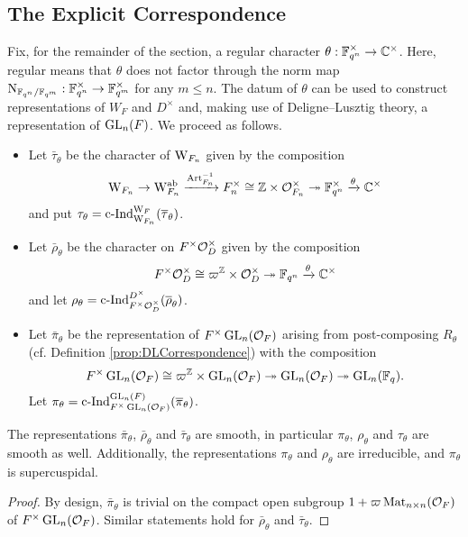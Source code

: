 \documentclass[../main.tex]{subfiles}
\begin{document}
\subsection{The Explicit Correspondence} %
\label{sub:The Explicit Correspondence}
Fix, for the remainder of the section, a regular character $\theta: \mathbb{F}_{q^n}^\times
\to \mathbb{C}^\times$. Here, regular means that $\theta$ does not factor through
the norm map $\mathrm{N}_{\mathbb{F}_{q^n}/\mathbb{F}_{q^m}}: \mathbb{F}_{q^n}^\times \to
\mathbb{F}_{q^m}^\times$ for any $m \leq n$. 
The datum of $\theta$ can be used to construct representations 
of $W_F$ and $D^\times$ and, making use of Deligne--Lusztig
theory, a representation of $\operatorname{GL}_n(F)$. We proceed as follows.
\begin{itemize}
  \item Let $\bar \tau_\theta$ be the character of $\mathrm W_{F_n}$ given by 
    the composition
    \begin{equation*}
      \mathrm W_{F_n} \to \mathrm W_{F_n}^{\mathrm{ab}} \xrightarrow{\mathrm{Art}_{F_n}^{-1}} F_n^\times \cong
      \mathbb{Z} \times \mathcal{O}_{F_n}^\times \twoheadrightarrow \mathbb{F}_{q^n}^\times \xrightarrow{\theta} \mathbb{C}^\times
    \end{equation*}
  and put $\tau_\theta = \mathrm{c\text{-}Ind}_{\mathrm W_{F_n}}^{\mathrm W_F}(\overline \tau_\theta)$.
  \item Let $\bar \rho_\theta$ be the character on 
    $F^\times \mathcal{O}_D^\times$ given by the composition
    \begin{equation*}
      F^\times\mathcal{O}_D^\times \cong \varpi^{\mathbb{Z}} \times \mathcal{O}_D^\times \twoheadrightarrow 
      \mathbb{F}_{q^n} \xrightarrow{\theta} \mathbb{C}^\times
    \end{equation*}
    and let $\rho_\theta = \mathrm{c\text{-}Ind}_{F^\times \mathcal{O}_D^\times}^{D^\times}(\overline \rho_\theta)$.
  \item Let $\bar \pi_\theta$ be the representation of $F^\times \operatorname{GL}_n(\mathcal{O}_F)$
    arising from post-composing $R_\theta$ (cf. Definition
    \ref{prop:DLCorrespondence}) with the composition
    \begin{equation*}
      F^\times \operatorname{GL}_n(\mathcal{O}_F) \cong \varpi^{\mathbb{Z}} \times \operatorname{GL}_n(\mathcal{O}_F)
      \twoheadrightarrow \operatorname{GL}_n(\mathcal{O}_F) \twoheadrightarrow \operatorname{GL}_n(\mathbb{F}_q).
    \end{equation*}
    Let $\pi_\theta = \mathrm{c\text{-}Ind}_{F^\times \operatorname{GL}_n(\mathcal{O}_F)}^{\operatorname{GL}_n(F)}(\overline \pi_\theta)$. 
\end{itemize}

\begin{lem}\label{lem:BarRepsAreSmooth}
  The representations $\bar \pi_\theta$, $\bar \rho_\theta$ and $\bar
  \tau_\theta$ are smooth, in particular
  $\pi_\theta$, $\rho_\theta$ and $\tau_\theta$ are smooth as well. Additionally, the
  representations $\pi_\theta$ and $\rho_\theta$ are irreducible, and
  $\pi_\theta$ is supercuspidal.
\begin{proof}
  By design, $\bar \pi_\theta$ is trivial on the compact open subgroup $1 +
  \varpi \operatorname{Mat}_{n \times n}(\mathcal{O}_F)$ of $F^\times \operatorname{GL}_n(\mathcal{O}_F)$. Similar
  statements hold for $\bar \rho_\theta$
  and $\bar \tau_\theta$. 
\end{proof}
\end{lem}
\end{document}
